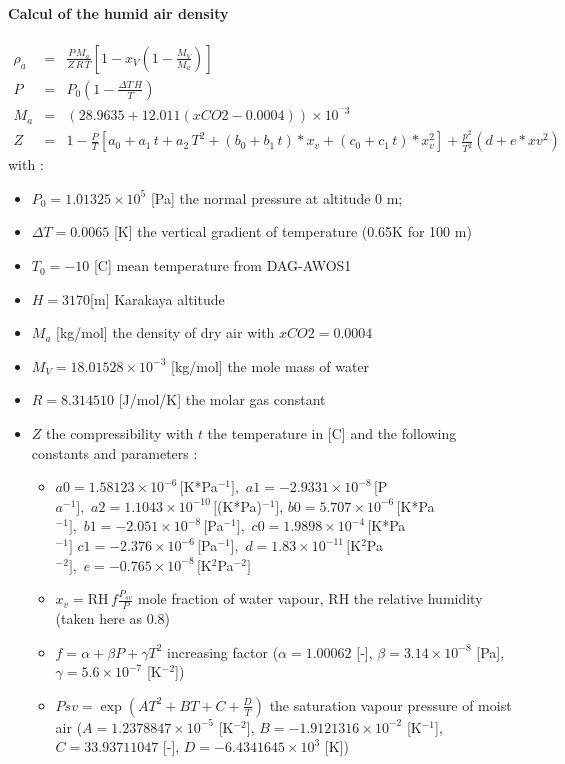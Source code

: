 \paragraph*{Calcul of the humid air density}
\begin{eqnarray}
	\rho_a &= & \frac{P\,M_a}{Z\,R\,T}\left[1-x_V\left(1-\frac{M_V}{M_a}\right)\right]\label{subsubsec:rho_a}\\
	P &= & P_0\left(1-\frac{\Delta T\,H}{T}\right)\nonumber\\
	M_a &= &\left(28.9635+12.011(xCO2-0.0004)\right)\times 10^{^-3}\nonumber\\
	Z &= &1-\frac{P}{T}\left[a_0+a_1\,t+a_2\,T^2+\left(b_0+b_1\,t\right)*x_v +(c_0+c_1\,t)*x_v^2\right] +\frac{p^2}{T^2}\left(d+e*xv^2\right)\nonumber
\end{eqnarray}
with :
\begin{itemize}
	\item $P_0 = 1.01325\times 10^5$ [Pa] the normal pressure at altitude 0 m;
	\item $\Delta T = 0.0065$ [K] the vertical gradient of temperature (0.65K for 100 m)\cite{wiki_DP}
	\item $T_0 = -10$ [\degree C] mean temperature from DAG-AWOS1
	\item $H = 3170$[m] Karakaya altitude
	\item $M_a$ [kg/mol] the density of dry air with $xCO2 = 0.0004$ \cite{Davis1992}
	\item $M_V = 18.01528\times 10^{-3}$ [kg/mol] the mole mass of water
	\item $R = 8.314510$ [J/mol/K] the molar gas constant
	\item $Z$ the compressibility with $t$ the temperature in [\degree C] and the following constants and parameters \cite{Davis1992} :\\
	\begin{itemize}
		\item $a0 = 1.58123\times 10^{-6}\,[$K*Pa$^{-1}],\,\,a1 = -2.9331\times 10^{-8}\,[$P$a^{-1}],\,\, a2 = 1.1043\times 10^{-10}\,[$(K*Pa)$^{-1}]$, $b0 = 5.707\times 10^{-6}\,[$K*Pa$^{-1}],\,\,b1 = -2.051\times 10^{-8}\,[$Pa$^{-1}],\,\,c0 = 1.9898\times 10^{-4}\,[$K*Pa$^{-1}]\,\,c1 = -2.376\times 10^{-6}\,[$Pa$^{-1}],\,\,d  = 1.83\times 10^{-11}\,[$K$^2$Pa$^{-2}],\,\,e  = -0.765\times 10^{-8}\,[$K$^2$Pa$^{-2}]$
		\item $x_v = $RH$\,f\frac{P_{sv}}{P}$ mole fraction of water vapour, RH the relative humidity (taken here as 0.8)
		\item $f = \alpha+\beta P+\gamma T^2$ increasing factor ($\alpha = 1.00062$ [-], $\beta  = 3.14\times 10^{-8}$ [Pa], $\gamma = 5.6\times 10^{-7}$ [K$^{-2}$])
		\item $Psv = \exp\left(AT^2+BT +C+\frac{D}{T}\right)$ the saturation vapour pressure of moist air ($A = 1.2378847\times 10^{-5}$ [K$^{-2}$], $B = -1.9121316\times 10^{-2}$ [K$^{-1}$], $C = 33.93711047$ [-], $D = -6.4341645\times 10^3$ [K])
	\end{itemize}	 
\end{itemize}

